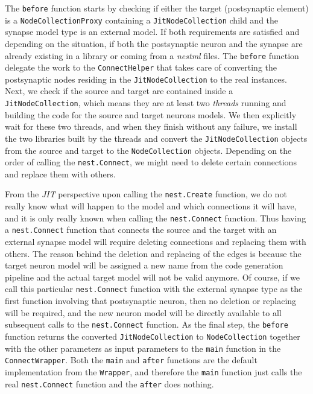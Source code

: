 The \texttt{before} function starts by checking if either the target (postsynaptic element) is a \texttt{NodeCollectionProxy} containing a \texttt{JitNodeCollection} child and the synapse model type is an external model. If both requirements are satisfied and depending on the situation, if both the postsynaptic neuron and the synapse are already existing in a library or coming from a \emph{nestml} files. The \texttt{before} function delegate the work to the \texttt{ConnectHelper} that takes care of converting the postsynaptic nodes residing in the \texttt{JitNodeCollection} to the real instances. Next, we check if the source and target are contained inside a \texttt{JitNodeCollection}, which means they are at least two \emph{threads} running and building the code for the source and target neurons models. We then explicitly wait for these two threads, and when they finish without any failure, we install the two libraries built by the threads and convert the \texttt{JitNodeCollection} objects from the source and target to the \texttt{NodeCollection} objects. Depending on the order of calling the \texttt{nest.Connect}, we might need to delete certain connections and replace them with others. 

From the \emph{JIT} perspective upon calling the \texttt{nest.Create} function, we do not really know what will happen to the model and which connections it will have, and it is only really known when calling the \texttt{nest.Connect} function. Thus having a \texttt{nest.Connect} function that connects the source and the target with
an external synapse model will require deleting connections and replacing them with others. The reason behind the deletion and replacing of the edges is because the target neuron model will be assigned a new name from the code generation pipeline and the actual target model will not be valid anymore. Of course, if we call this particular  \texttt{nest.Connect} function with the external synapse type as the first function involving that postsynaptic neuron, then no deletion or replacing will be required, and the new neuron model will be directly available to all subsequent calls to the \texttt{nest.Connect} function. As the final step, the \texttt{before} function returns the converted \texttt{JitNodeCollection} to \texttt{NodeCollection} together with the other parameters as input parameters to the \texttt{main} function in the \texttt{ConnectWrapper}. Both the \texttt{main} and \texttt{after} functions are the default implementation from the \texttt{Wrapper}, and therefore the \texttt{main} function just calls the real \texttt{nest.Connect} function and the \texttt{after} does nothing.


